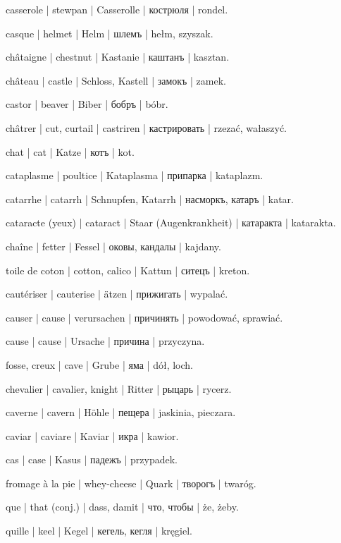 \begin{outdent}{1em}
casserole | stewpan | Casserolle | кострюля | rondel.

casque | helmet | Helm | шлемъ | hełm, szyszak.

châtaigne | chestnut | Kastanie | каштанъ | kasztan.

château | castle | Schloss, Kastell | замокъ | zamek.

castor | beaver | Biber | бобръ | bóbr.

châtrer | cut, curtail | castriren | кастрировать | rzezać, wałaszyć.

chat | cat | Katze | котъ | kot.

cataplasme | poultice | Kataplasma | припарка | kataplazm.

catarrhe | catarrh | Schnupfen, Katarrh | насморкъ, катаръ | katar.

cataracte (yeux) | cataract | Staar (Augenkrankheit) | катаракта | katarakta.

chaîne | fetter | Fessel | оковы, кандалы | kajdany.

toile de coton | cotton, calico | Kattun | ситецъ | kreton.

cautériser | cauterise | ätzen | прижигать | wypalać.

causer | cause | verursachen | причинять | powodować, sprawiać.

\uvsubentry{}
cause | cause | Ursache | причина | przyczyna.

fosse, creux | cave | Grube | яма | dół, loch.

chevalier | cavalier, knight | Ritter | рыцарь | rycerz.

caverne | cavern | Höhle | пещера | jaskinia, pieczara.

caviar | caviare | Kaviar | икра | kawior.

cas | case | Kasus | падежъ | przypadek.

fromage à la pie | whey-cheese | Quark | творогъ | twaróg.

que | that (conj.) | dass, damit | что, чтобы | że, żeby.

quille | keel | Kegel | кегель, кегля | kręgiel.


\end{outdent}
